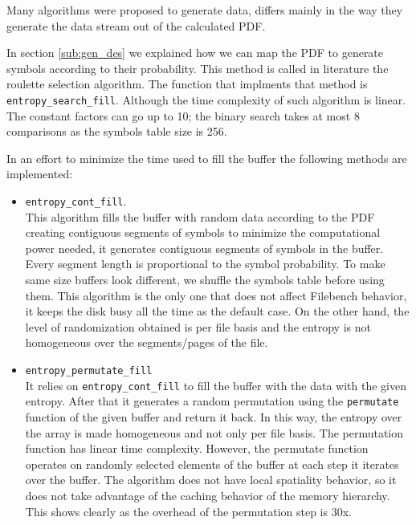 Many algorithms were proposed to generate data, differs mainly in the way they generate the data stream out of the calculated PDF.

In section \ref{sub:gen_des} we explained how we can map the PDF to generate symbols according to their probability. This method is called in literature the roulette selection algorithm. The function that implments that method is
 \verb+entropy_search_fill+. Although the time complexity of such algorithm is linear. The constant factors can go up to 10; the binary search takes at most 8 comparisons as the symbols table size is 256.

In an effort to minimize the time used to fill the buffer the following methods are implemented:

\begin{itemize}
\item \verb+entropy_cont_fill+. \\
    This algorithm fills the buffer with random data according to
    the PDF creating contiguous segments of symbols to minimize the computational power needed,
    it generates contiguous segments of symbols in the
    buffer. Every segment length is proportional to the symbol probability.
     To make same size buffers look different, we
    shuffle the symbols table before using them.
    This algorithm is the only one that does not affect
    Filebench behavior, it keeps the disk busy all the time
    as the default case. On the other hand, the level of randomization obtained is
    per file basis and the entropy is not homogeneous over the segments/pages
    of the file.
\item \verb+entropy_permutate_fill+\\
    It relies on \verb+entropy_cont_fill+ to fill the buffer
    with the data with the given entropy. After that it generates a
random permutation using the \verb+permutate+ function of the given
     buffer and return it back. In this way, the
    entropy over the array is made homogeneous and not only per file basis.
    The permutation function has linear time complexity. However, the permutate function
    operates on randomly selected elements of the buffer at each step it iterates over the buffer.
    The algorithm does not have local spatiality behavior, so
    it does not take advantage of the caching behavior of the memory hierarchy.
    This shows clearly as the overhead of the permutation step is 30x.


\end{itemize}
